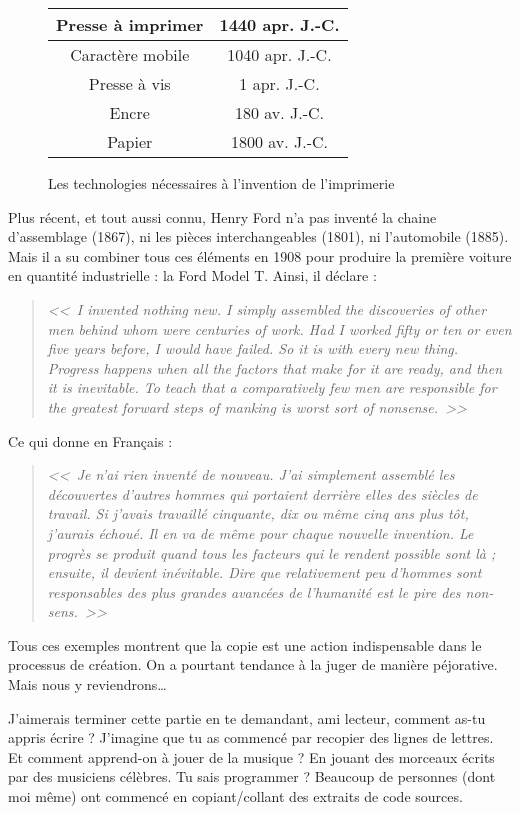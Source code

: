 \begin{figure}[H]
\center
\begin{tabular}{c|c}
Presse à imprimer & 1440 apr. J.-C. \\
\hline
Caractère mobile & 1040 apr. J.-C. \\
Presse à vis & 1 apr. J.-C. \\
Encre & 180 av. J.-C. \\
Papier & 1800 av. J.-C.
\end{tabular}
\caption{Les technologies nécessaires à l'invention de l'imprimerie}
\end{figure}

Plus récent, et tout aussi connu, Henry Ford n'a pas inventé la chaine d'assemblage (1867), ni les pièces interchangeables (1801), ni l'automobile (1885).
Mais il a su combiner tous ces éléments en 1908 pour produire la première voiture en quantité industrielle : la Ford Model T.
Ainsi, il déclare :

\begin{quotation}
\textit{<<~I invented nothing new.
I simply assembled the discoveries of other men behind whom were centuries of work.
Had I worked fifty or ten or even five years before, I would have failed.
So it is with every new thing.
Progress happens when all the factors that make for it are ready, and then it is inevitable.
To teach that a comparatively few men are responsible for the greatest forward steps of manking is worst sort of nonsense.~>>}
\end{quotation}

Ce qui donne en Français :

\begin{quotation}
\textit{<<~Je n'ai rien inventé de nouveau.
J'ai simplement assemblé les découvertes d'autres hommes qui portaient derrière elles des siècles de travail.
Si j'avais travaillé cinquante, dix ou même cinq ans plus tôt, j'aurais échoué.
Il en va de même pour chaque nouvelle invention.
Le progrès se produit quand tous les facteurs qui le rendent possible sont là ; ensuite, il devient inévitable.
Dire que relativement peu d'hommes sont responsables des plus grandes avancées de l'humanité est le pire des non-sens.~>>}
\end{quotation}

Tous ces exemples montrent que la copie est une action indispensable dans le processus de création.
On a pourtant tendance à la juger de manière péjorative.
Mais nous y reviendrons\dots{}

J'aimerais terminer cette partie en te demandant, ami lecteur, comment as-tu appris écrire ?
J'imagine que tu as commencé par recopier des lignes de lettres.
Et comment apprend-on à jouer de la musique ?
En jouant des morceaux écrits par des musiciens célèbres.
Tu sais programmer ?
Beaucoup de personnes (dont moi même) ont commencé en copiant/collant des extraits de code sources.

